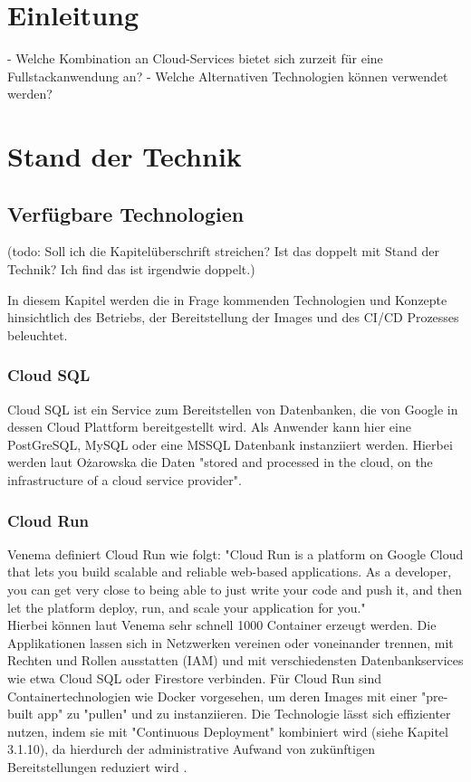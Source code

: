 \documentclass[pdftex,a4paper,abstracton,11pt,parskip=half,bibtotocnumbered]{scrartcl}
\begin{document}
\section{Einleitung}
 - Welche Kombination an Cloud-Services bietet sich zurzeit für eine Fullstackanwendung an?
 - Welche Alternativen Technologien können verwendet werden?


\section{Stand der Technik}
	
	\subsection{Verfügbare Technologien} 
	(todo: Soll ich die Kapitelüberschrift streichen? Ist das doppelt mit Stand der Technik? Ich find das ist irgendwie doppelt.)

	In diesem Kapitel werden die in Frage kommenden Technologien und Konzepte hinsichtlich des Betriebs, der Bereitstellung der Images und des
	CI/CD Prozesses beleuchtet. 

		\subsubsection{Cloud SQL}		
			Cloud SQL ist ein Service zum Bereitstellen von Datenbanken, die von Google in dessen Cloud Plattform bereitgestellt wird. Als Anwender kann hier eine
			PostGreSQL, MySQL oder eine MSSQL Datenbank instanziiert werden. Hierbei werden laut Ożarowska die Daten "stored and processed in the cloud, on the infrastructure of a cloud 
			service provider". \cite{cloudsql}

		\subsubsection{Cloud Run}
			Venema definiert Cloud Run wie folgt: "Cloud Run is a platform on Google Cloud that lets you build scalable and reliable web-based applications. As
 			a developer, you can get very close to being able to just write your code and push it, and then let the platform deploy, run, and scale your application for you." \cite{Venema, S.1} \\
			Hierbei können laut Venema sehr schnell 1000 Container erzeugt werden. \cite{vgl. Venema, S. XVI}
			Die Applikationen lassen sich in Netzwerken vereinen oder voneinander trennen, mit Rechten und Rollen ausstatten (IAM) und mit verschiedensten 
			Datenbankservices wie etwa Cloud SQL oder Firestore verbinden. Für Cloud Run sind Containertechnologien wie Docker vorgesehen, um deren Images 
			mit einer "pre-built app" \cite{cloud-run-johnson} zu "pullen" und zu instanziieren. Die Technologie lässt sich effizienter nutzen, indem sie mit "Continuous 
			Deployment" kombiniert wird (siehe Kapitel 3.1.10), da hierdurch der administrative Aufwand von zukünftigen Bereitstellungen reduziert wird \cite{whats-cd-lamm}.
\end{document}
